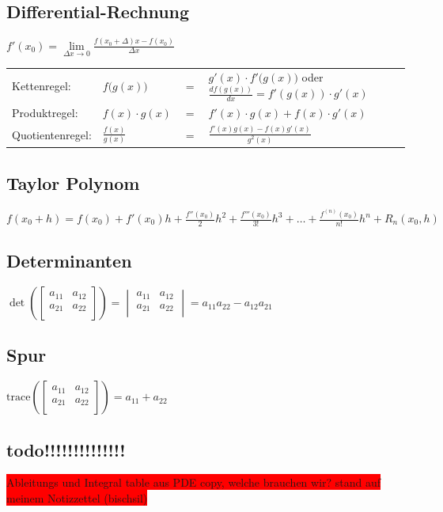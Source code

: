 \documentclass[a4paper]{scrartcl}
\begin{document}
	\subsection{Differential-Rechnung}
	  $f'(x_0)=\lim\limits_{\Delta x\rightarrow 0}
	  \frac{f(x_0+\Delta)x-f(x_0)}{\Delta x}$\\
		\begin{tabular}{llll}
			Kettenregel:	& $f\big(g(x)\big)$ &$=$ & $g'(x)\cdot f'\big(g(x)\big)$
			oder $\frac{d f(g(x))}{dx} = f'(g(x)) \cdot g'(x)$\\[0.1cm] Produktregel:	&
			$f(x)\cdot g(x)$ &$=$ & $f'(x)\cdot g(x) + f(x)\cdot g'(x)$\\[0.1cm] Quotientenregel:& $\frac{f(x)}{g(x)}$ &$=$ & $\frac{f'(x)g(x)-f(x)g'(x)}{g^2(x)}$\\
		\end{tabular}
		
		
	\subsection{Taylor Polynom}
		$f(x_0+h)=f(x_0) + f'(x_0)h + \frac{f''(x_0)}{2}h^2 + \frac{f'''(x_0)}{3!}h^3 + \ldots + \frac{f^{(n)}(x_0)}{n!}h^n + R_n(x_0, h)$

	\subsection{Determinanten}
		$\det\left(
		\begin{bmatrix}
			a_{11}&a_{12}\\
			a_{21}&a_{22}\\
		\end{bmatrix}\right)=
		\begin{vmatrix}
			a_{11}&a_{12}\\
			a_{21}&a_{22}\\
		\end{vmatrix}=a_{11}a_{22}-a_{12}a_{21}$
		
	\subsection{Spur}
			$\text{trace}\left(
		\begin{bmatrix}
			a_{11}&a_{12}\\
			a_{21}&a_{22}\\
		\end{bmatrix}\right)=
		a_{11} + a_{22}$\\
		
		\subsection{todo!!!!!!!!!!!!!!}
		\colorbox{red}{Ableitungs und Integral table aus PDE copy, welche
		brauchen wir? stand auf meinem Notizzettel (bischsil)}
		
\end{document}
